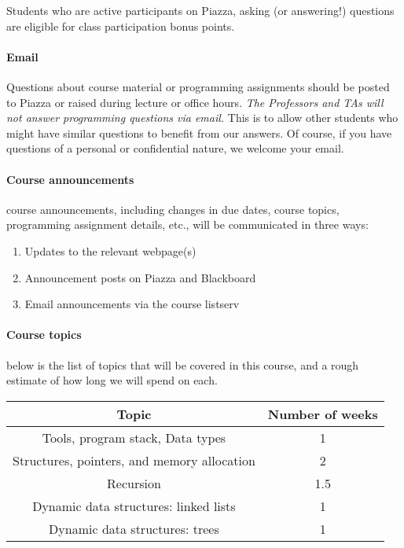 \documentclass{article}
\begin{document}
Students who are active participants on Piazza, asking (or answering!) questions are eligible for class participation bonus points.

\paragraph{Email} Questions about course material or programming assignments should be posted to Piazza or raised during lecture or office hours. {\em The Professors and TAs will not answer programming questions via email.} This is to allow other students who might have similar questions to benefit from our answers. Of course, if you have questions of a personal or confidential nature, we welcome your email.

\paragraph{Course announcements} course announcements, including changes in due dates, course topics, programming assignment details, etc., will be communicated in three ways:
\begin{enumerate}
\item Updates to the relevant webpage(s)
\item Announcement posts on Piazza and Blackboard
\item Email announcements via the course listserv
\end{enumerate}

\paragraph{Course topics} below is the list of topics that will be covered in this course, and a rough estimate of how long we will spend on each. 
\begin{table}[H]
\centering
\begin{tabulary}{\linewidth}{|c|c|} \hline
Topic & Number of weeks \\ \hline
Tools, program stack, Data types & 1 \\ \hline
Structures, pointers, and memory allocation & 2 \\ \hline
Recursion & 1.5 \\ \hline
Dynamic data structures: linked lists & 1 \\ \hline
Dynamic data structures: trees & 1 \\
\hline
\end{tabulary}
\end{table}
\end{document}
